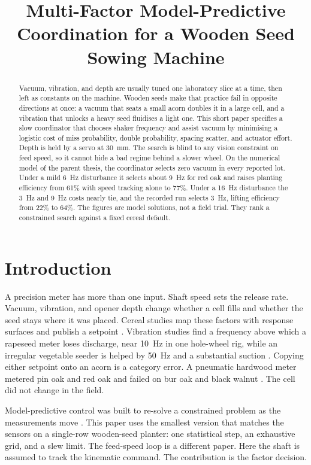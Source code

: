 \documentclass[11pt,a4paper]{article}
\title{Multi-Factor Model-Predictive Coordination for a Wooden Seed Sowing Machine}
\author{}
\date{}
\begin{document}
\maketitle
\thispagestyle{empty}

\begin{abstract}
\noindent
Vacuum, vibration, and depth are usually tuned one laboratory slice at a time, then left as constants on the machine. Wooden seeds make that practice fail in opposite directions at once: a vacuum that seats a small acorn doubles it in a large cell, and a vibration that unlocks a heavy seed fluidises a light one. This short paper specifies a slow coordinator that chooses shaker frequency and assist vacuum by minimising a logistic cost of miss probability, double probability, spacing scatter, and actuator effort. Depth is held by a servo at 30~mm. The search is blind to any vision constraint on feed speed, so it cannot hide a bad regime behind a slower wheel. On the numerical model of the parent thesis, the coordinator selects zero vacuum in every reported lot. Under a mild 6~Hz disturbance it selects about 9~Hz for red oak and raises planting efficiency from 61\% with speed tracking alone to 77\%. Under a 16~Hz disturbance the 3~Hz and 9~Hz costs nearly tie, and the recorded run selects 3~Hz, lifting efficiency from 22\% to 64\%. The figures are model solutions, not a field trial. They rank a constrained search against a fixed cereal default.
\end{abstract}

\section{Introduction}

A precision meter has more than one input. Shaft speed sets the release rate. Vacuum, vibration, and opener depth change whether a cell fills and whether the seed stays where it was placed. Cereal studies map these factors with response surfaces and publish a setpoint \cite{yazgi2007,karayel2004}. Vibration studies find a frequency above which a rapeseed meter loses discharge, near 10~Hz in one hole-wheel rig, while an irregular vegetable seeder is helped by 50~Hz and a substantial suction \cite{zhang2024,li2025,wu2022}. Copying either setpoint onto an acorn is a category error. A pneumatic hardwood meter metered pin oak and red oak and failed on bur oak and black walnut \cite{wells1990}. The cell did not change in the field.

Model-predictive control was built to re-solve a constrained problem as the measurements move \cite{garcia1989,camacho2007,qin2003}. This paper uses the smallest version that matches the sensors on a single-row wooden-seed planter: one statistical step, an exhaustive grid, and a slew limit. The feed-speed loop is a different paper. Here the shaft is assumed to track the kinematic command. The contribution is the factor decision.
\end{document}
